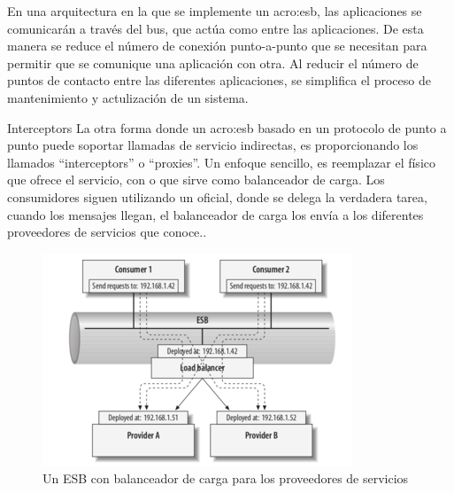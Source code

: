 
En una arquitectura en la que se implemente un \gls{acro:esb}, las aplicaciones se comunicarán a través del bus, que actúa como  entre las aplicaciones. De esta manera se reduce el número de conexión punto-a-punto que se necesitan para permitir que se comunique una aplicación con otra.  Al reducir el número de puntos de contacto entre las diferentes aplicaciones, se simplifica el proceso de mantenimiento y actulización de un sistema.


Interceptors
La otra forma donde un \gls{acro:esb} basado en un protocolo de punto a punto puede soportar llamadas de servicio indirectas, es proporcionando los llamados ``interceptors'' o ``proxies''. Un enfoque sencillo, es reemplazar el  físico que ofrece el servicio, con  o  que sirve como balanceador de carga. Los consumidores siguen utilizando un  oficial, donde se delega la verdadera tarea, cuando los mensajes llegan, el balanceador de carga los envía a los diferentes proveedores de servicios que conoce.\cite[p.~52]{josuttis2007}.

\begin{figure}[H]
  \includegraphics[width=\linewidth]{src/images/02-capitulo-2/tecnologias/esb/esb-interceptors-load-balancer.png}
  \caption{Un ESB con balanceador de carga para los proveedores de servicios}
  \label{fig:esb-interceptors-load-balancer}
\end{figure}
